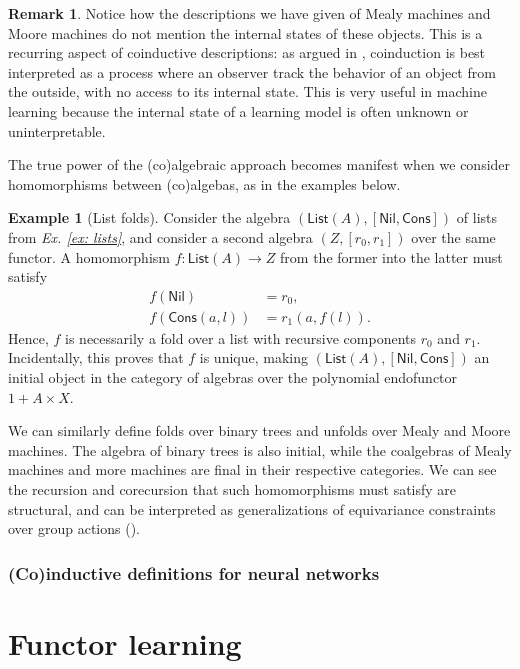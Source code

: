 \documentclass[12pt,a4paper,openright,twoside]{report}
\theoremstyle{plain}
\theoremstyle{definition}
\newtheorem{remark}[proposition]{Remark}
\newtheorem{example}[proposition]{Example}
\begin{document}
\begin{remark}
  Notice how the descriptions we have given of Mealy machines and Moore machines do not mention the internal states of these objects. This is a recurring aspect of coinductive descriptions: as argued in \cite{jacobs1997tutorial}, coinduction is best interpreted as a process where an observer track the behavior of an object from the outside, with no access to its internal state. This is very useful in machine learning because the internal state of a learning model is often unknown or uninterpretable.
\end{remark}

The true power of the (co)algebraic approach becomes manifest when we consider homomorphisms between (co)algebas, as in the examples below.

\begin{example}[List folds]
  Consider the algebra $(\mathsf{List}(A), [\mathsf{Nil}, \mathsf{Cons}])$ of lists from \textit{Ex. \ref{ex: lists}}, and consider a second algebra $(Z, [r_0,r_1])$ over the same functor. A homomorphism $f: \mathsf{List}(A) \to Z$ from the former into the latter must satisfy 
  \begin{align*}
    f(\mathsf{Nil}) &= r_0,\\
    f(\mathsf{Cons}(a,l)) &= r_1(a,f(l)). 
  \end{align*}
  Hence, $f$ is necessarily a fold over a list with recursive components $r_0$ and $r_1$. Incidentally, this proves that $f$ is unique, making $(\mathsf{List}(A), [\mathsf{Nil}, \mathsf{Cons}])$ an initial object in the category of algebras over the polynomial endofunctor $1 + A \times X$.
\end{example}

We can similarly define folds over binary trees and unfolds over Mealy and Moore machines. The algebra of binary trees is also initial, while the coalgebras of Mealy machines and more machines are final in their respective categories. We can see the recursion and corecursion that such homomorphisms must satisfy are structural, and can be interpreted as generalizations of equivariance constraints over group actions (\cite{gavranovicposition}).


\subsubsection{(Co)inductive definitions for neural networks}


\section{Functor learning}
\end{document}
